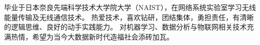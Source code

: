 

\begin{cvparagraph}



毕业于日本奈良先端科学技术大学院大学（NAIST），在网络系统实验室学习无线能量传输及无线通信技术。
热爱技术，喜欢钻研，团结集体，勇担责任，有清晰的逻辑思维、良好的动手实践能力。
对机器学习、数据分析与物联网相关技术充满热情，希望为当今大数据新时代造福社会添砖加瓦。

\end{cvparagraph}